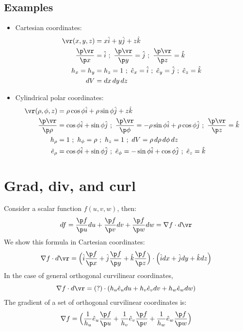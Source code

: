 \documentclass[a4paper, 11pt, normalem]{report}
\begin{document}
\subsection{Examples}
\begin{itemize}
    \item Cartesian coordinates:
        \begin{align*}
            \vr(x, y, z) &= x\hat{i} + y\hat{j} + z\hat{k} \\
            \frac{\p\vr}{\p x} &= \hat{i} ~;~ \frac{\p \vr}{\p y}= \hat{j} ~;~ \frac{\p \vr}{\p z} = \hat{k} \\
            h_x = h_y &= h_z = 1 ~;~ \hat{e}_x = \hat{i} ~;~ \hat{e}_y = \hat{j} ~;~ \hat{e}_z = \hat{k} \\
            dV &= dx\,dy\,dz
        \end{align*}
    \item Cylindrical polar coordinates:
        \begin{align*}
            \vr(\rho, \phi, z) &= \rho\cos\phi \hat{i} + \rho\sin\phi \hat{j} + z\hat{k} \\
            \frac{\p\vr}{\p \rho} &= \cos\phi \hat{i} + \sin\phi \hat{j} ~;~ \frac{\p\vr}{\p \phi} = -\rho\sin\phi \hat{i} + \rho\cos\phi \hat{j} ~;~ \frac{\p\vr}{\p z} = \hat{k} \\
            h_{\rho} &= 1 ~;~ h_\phi = \rho ~;~ h_z = 1 ~;~ dV = \rho\,d\rho\,d\phi\,dz \\
            \hat{e}_\rho &= \cos\phi \hat{i} + \sin\phi\hat{j} ~;~ \hat{e}_\phi = -\sin\phi \hat{i} + \cos\phi \hat{j} ~;~
            \hat{e}_z = \hat{k}
        \end{align*}
\end{itemize}

\section{Grad, div, and curl}
Consider a scalar function $f(u, v, w)$, then:
\begin{equation}
    df = \frac{\p f}{\p u}du + \frac{\p f}{\p v}dv + \frac{\p f}{\p w}dw = \nabla f \cdot d\vr
\end{equation}
We show this formula in Cartesian coordinates:
\begin{equation*}
    \nabla f \cdot d\vr = \Big(\hat{i}\frac{\p f}{\p x} + \hat{j}\frac{\p f}{\p y} + \hat{k}\frac{\p f}{\p z}\Big)\cdot\Big(\hat{i}dx + \hat{j}dy + \hat{k}dz \Big)
\end{equation*}
In the case of general orthogonal curvilinear coordinates,
\begin{equation*}
    \nabla f \cdot d\vr = (?)\cdot(h_u \hat{e}_u du + h_v\hat{e}_v dv + h_w\hat{e}_w dw)
\end{equation*}
The gradient of a set of orthogonal curvilinear coordinates is:
\begin{equation*}
    \nabla f = \Big(\frac{1}{h_u}\hat{e}_u \frac{\p f}{\p u} + \frac{1}{h_v} \hat{e}_v \frac{\p f}{\p v} + \frac{1}{h_w}\hat{e}_w \frac{\p f}{\p w}\Big)
\end{equation*}
\end{document}
